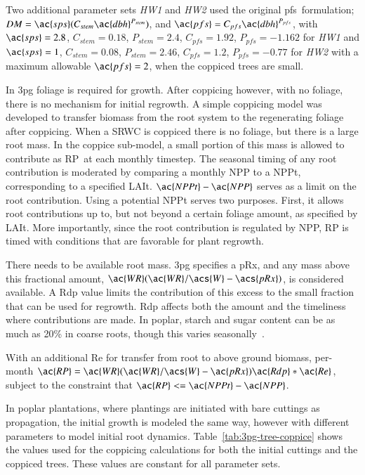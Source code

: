 \documentclass[preprint,12pt]{elsarticle}
\begin{document}
Two additional parameter sets \emph{HW1} and \emph{HW2} used the
original \ac{pfs}~formulation; $DM=\ac{sps}(C_{stem}
\ac{dbh}^{P_{stem}})$, and $\ac{pfs} = C_{pfs} \ac{dbh}^{P_{pfs}}$,
with $\ac{sps}=2.8$, $C_{stem}=0.18$, $P_{stem}=2.4$, $C_{pfs}=1.92$,
$P_{pfs}=-1.162$ for \emph{HW1} and $\ac{sps}=1$, $C_{stem}=0.08$,
$P_{stem}=2.46$, $C_{pfs}=1.2$, $P_{pfs}=-0.77$ for \emph{HW2} with a
maximum allowable $\ac{pfs}=2$, when the coppiced trees are small.

In \ac{3pg} foliage is required for growth.  After coppicing however,
with no foliage, there is no mechanism for initial regrowth. A simple
coppicing model was developed to transfer biomass from the root system
to the regenerating foliage after coppicing.  When a \ac{SRWC} is
coppiced there is no foliage, but there is a large root mass.  In the
coppice sub-model, a small portion of this mass is allowed to
contribute as \ac{RP}~at each monthly timestep.  The seasonal timing
of any root contribution is moderated by comparing a monthly \ac{NPP}
to a \ac{NPPt}, corresponding to a specified
\ac{LAIt}. $\ac{NPPt}-\ac{NPP}$ serves as a limit on the root
contribution.  Using a potential \ac{NPPt} serves two purposes. First,
it allows root contributions up to, but not beyond a certain foliage
amount, as specified by \ac{LAIt}.  More importantly, since the root
contribution is regulated by \ac{NPP}, \ac{RP} is timed with
conditions that are favorable for plant regrowth.

There needs to be available root mass.  \ac{3pg} specifies a \ac{pRx},
and any mass above this fractional amount,
$\ac{WR}(\ac{WR}/\acs{W}-\acs{pRx})$, is considered available.  A
\ac{Rdp} value limits the contribution of this excess to the small
fraction that can be used for regrowth. \ac{Rdp} affects both the
amount and the timeliness where contributions are made.  In poplar,
starch and sugar content can be as much as 20\% in coarse roots,
though this varies seasonally~\cite{Regier2010}.

With an additional \ac{Re} for transfer from root to above ground
biomass, per-month $\ac{RP} =
\ac{WR}(\ac{WR}/\acs{W}-\ac{pRx})\ac{Rdp}*\ac{Re}$, subject to the
constraint that $\ac{RP} <= \ac{NPPt}-\ac{NPP}$.

In poplar plantations, where plantings are initiated with bare
cuttings as propagation, the initial growth is modeled the same way,
however with different parameters to model initial root dynamics.
Table~\ref{tab:3pg-tree-coppice} shows the values used for the
coppicing calculations for both the initial cuttings and the coppiced
trees.  These values are constant for all parameter sets.
\end{document}
